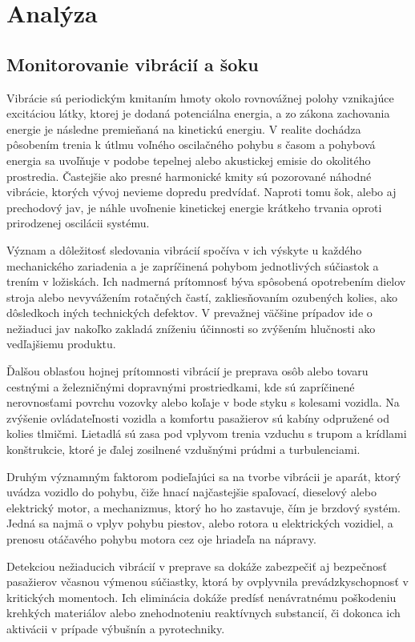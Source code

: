 \chapter{Analýza}

\section{Monitorovanie vibrácií a šoku}
Vibrácie sú periodickým kmitaním hmoty okolo rovnovážnej polohy vznikajúce excitáciou látky, ktorej je dodaná potenciálna energia, a zo zákona zachovania energie je následne premieňaná na kinetickú energiu. V realite dochádza pôsobením trenia k útlmu voľného oscilačného pohybu s časom  a pohybová energia sa uvoľňuje v podobe tepelnej alebo akustickej emisie do okolitého prostredia. Častejšie ako presné harmonické kmity sú pozorované náhodné vibrácie, ktorých vývoj nevieme dopredu predvídať. Naproti tomu šok, alebo aj prechodový jav, je náhle uvoľnenie kinetickej energie krátkeho trvania oproti prirodzenej oscilácii systému. 

Význam a dôležitosť sledovania vibrácií spočíva v ich výskyte u každého mechanického zariadenia a je zapríčinená pohybom jednotlivých súčiastok a trením v ložiskách. Ich nadmerná prítomnosť býva spôsobená opotrebením dielov stroja alebo nevyvážením rotačných častí, zakliesňovaním ozubených kolies, ako dôsledkoch iných technických defektov. V prevažnej väčšine prípadov ide o nežiaduci jav nakoľko zakladá zníženiu účinnosti so zvýšením hlučnosti ako vedľajšiemu produktu. 

Ďalšou oblasťou hojnej prítomnosti vibrácií je preprava osôb alebo tovaru cestnými a železničnými dopravnými prostriedkami, kde sú zapríčinené nerovnosťami povrchu vozovky alebo koľaje v bode styku s kolesami vozidla. Na zvýšenie ovládateľnosti vozidla a komfortu pasažierov sú kabíny odpružené od kolies tlmičmi. Lietadlá sú zasa pod vplyvom trenia vzduchu s trupom a krídlami konštrukcie, ktoré je ďalej zosilnené vzdušnými prúdmi a turbulenciami. 

Druhým významným faktorom podieľajúci sa na tvorbe vibrácii je aparát, ktorý uvádza vozidlo do pohybu, čiže hnací najčastejšie spaľovací, dieselový alebo elektrický motor, a mechanizmus, ktorý ho ho zastavuje, čím je brzdový systém. Jedná sa najmä o vplyv pohybu piestov, alebo rotora u elektrických vozidiel, a prenosu otáčavého pohybu motora cez oje hriadeľa na nápravy.

Detekciou nežiaducich vibrácií v preprave sa dokáže zabezpečiť aj bezpečnosť pasažierov včasnou výmenou súčiastky, ktorá by ovplyvnila prevádzkyschopnosť v kritických momentoch. Ich eliminácia dokáže predísť nenávratnému poškodeniu krehkých materiálov alebo znehodnoteniu reaktívnych substancií, či dokonca ich aktivácii v prípade výbušnín a pyrotechniky.

